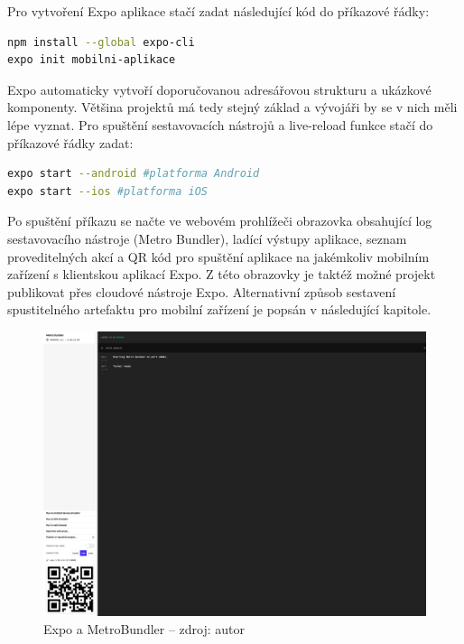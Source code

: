 Pro vytvoření Expo aplikace stačí zadat následující kód do příkazové řádky:

\begin{lstlisting}[language=Bash, caption=Vytvoření základní struktury aplikace,label={expoinstall}]
npm install --global expo-cli
expo init mobilni-aplikace
\end{lstlisting}

Expo automaticky vytvoří doporučovanou adresářovou strukturu a ukázkové komponenty. Většina projektů má tedy stejný základ a vývojáři by se v nich měli lépe vyznat. Pro spuštění sestavovacích nástrojů a live-reload funkce stačí do příkazové řádky zadat:

\begin{lstlisting}[language=Bash, caption=Spuštění mobilní aplikace na virtuálním stroji nebo připojeném zařízení,label={expostart}]
expo start --android #platforma Android
expo start --ios #platforma iOS
\end{lstlisting}

Po spuštění příkazu se načte ve webovém prohlížeči obrazovka obsahující log sestavovacího nástroje (Metro Bundler), ladící výstupy aplikace, seznam proveditelných akcí a QR kód pro spuštění aplikace na jakémkoliv mobilním zařízení s klientskou aplikací Expo. Z této obrazovky je taktéž možné projekt publikovat přes cloudové nástroje Expo. Alternativní způsob sestavení spustitelného artefaktu pro mobilní zařízení je popsán v následující kapitole.

\begin{figure}[h]
	\begin{center}
		\includegraphics[width=140mm]{img/expo.png}
	\end{center}
	\caption[Expo a MetroBundler]{Expo a MetroBundler -- zdroj: autor}
\end{figure}

